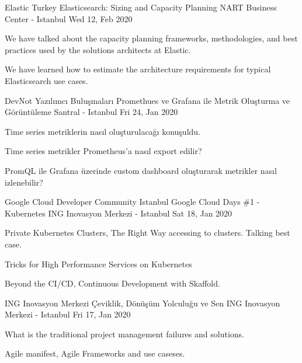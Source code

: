 \begin{cventries}
    \cventry
    {Elastic Turkey}
    {Elasticsearch: Sizing and Capacity Planning}
    {NART Business Center - Istanbul}
    {Wed 12, Feb 2020}
    {
      \begin{cvitems}
        \item{We have talked about the capacity planning frameworks, methodologies, and best practices used by the solutions architects at Elastic.}
        \item{We have learned how to estimate the architecture requirements for typical Elasticsearch use cases.}
      \end{cvitems}
    }
    
    \cventry
    {DevNot Yazılımcı Buluşmaları}
    {Promethues ve Grafana ile Metrik Oluşturma ve Görüntüleme}
    {Santral - Istanbul}
    {Fri 24, Jan 2020}
    {
      \begin{cvitems}
        \item{Time series metriklerin nasıl oluşturulacağı konuşuldu.}
        \item{Time series metrikler Prometheus'a nasıl export edilir?}
        \item{PromQL ile Grafana üzerinde custom dashboard oluşturarak metrikler nasıl izlenebilir?}
      \end{cvitems}
    }
    
    \cventry
    {Google Cloud Developer Community Istanbul}
    {Google Cloud Days \#1 - Kubernetes}
    {ING Inovasyon Merkezi - Istanbul}
    {Sat 18, Jan 2020}
    {
      \begin{cvitems}
        \item{Private Kubernetes Clusters, The Right Way accessing to clusters. Talking best case.}
        \item{Tricks for High Performance Services on Kubernetes}
        \item{Beyond the CI/CD, Continuous Development with Skaffold.}
      \end{cvitems}
    }
    
    \cventry
    {ING Inovasyon Merkezi}
    {Çeviklik, Dönüşüm Yolculuğu ve Sen}
    {ING Inovasyon Merkezi - Istanbul}
    {Fri 17, Jan 2020}
    {
      \begin{cvitems}
        \item{What is the traditional project management failures and solutions.}
        \item{Agile manifest, Agile Frameworks and use caseses.}
      \end{cvitems}
    }
    

\end{cventries}
